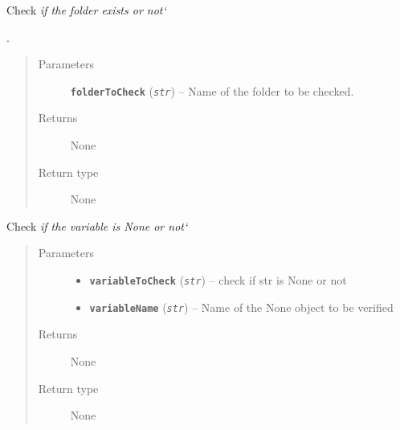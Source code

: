 \documentclass[letterpaper,10pt,english]{sphinxmanual}
\begin{document}

\begin{fulllineitems}
\label{iCallSV:iCallSV.checkparameters.checkDir}
Check \emph{if the folder exists or not{}`}

.
\begin{quote}\begin{description}
\item[{Parameters}] \leavevmode
\textbf{\texttt{folderToCheck}} (\emph{\texttt{str}}) -- Name of the folder to be checked.

\item[{Returns}] \leavevmode
None

\item[{Return type}] \leavevmode
None

\end{description}\end{quote}

\end{fulllineitems}


\begin{fulllineitems}
\label{iCallSV:iCallSV.checkparameters.checkEmpty}
Check \emph{if the variable is None or not{}`}
\begin{quote}\begin{description}
\item[{Parameters}] \leavevmode\begin{itemize}
\item {} 
\textbf{\texttt{variableToCheck}} (\emph{\texttt{str}}) -- check if str is None or not

\item {} 
\textbf{\texttt{variableName}} (\emph{\texttt{str}}) -- Name of the None object to be verified

\end{itemize}

\item[{Returns}] \leavevmode
None

\item[{Return type}] \leavevmode
None

\end{description}\end{quote}

\end{fulllineitems}
\end{document}
